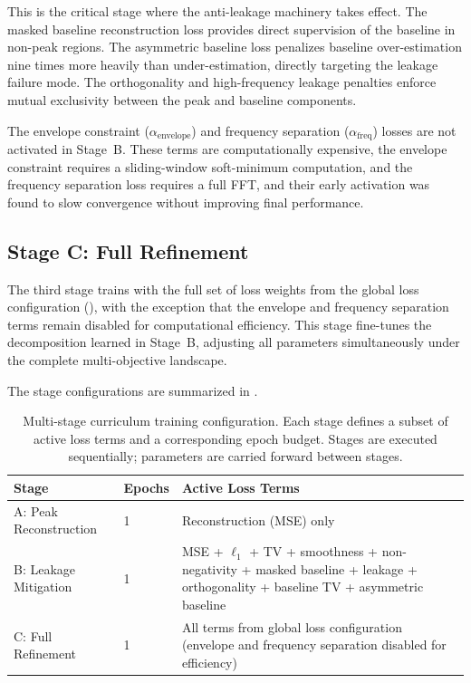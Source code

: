 This is the critical stage where the anti-leakage machinery takes effect. The masked baseline reconstruction loss provides direct supervision of the baseline in non-peak regions. The asymmetric baseline loss penalizes baseline over-estimation nine times more heavily than under-estimation, directly targeting the leakage failure mode. The orthogonality and high-frequency leakage penalties enforce mutual exclusivity between the peak and baseline components.

The envelope constraint ($\alpha_{\text{envelope}}$) and frequency separation ($\alpha_{\text{freq}}$) losses are not activated in Stage~B. These terms are computationally expensive, the envelope constraint requires a sliding-window soft-minimum computation, and the frequency separation loss requires a full FFT, and their early activation was found to slow convergence without improving final performance.


\subsection{Stage C: Full Refinement}
\label{sec:method_stage_c}

The third stage trains with the full set of loss weights from the global loss configuration (), with the exception that the envelope and frequency separation terms remain disabled for computational efficiency. This stage fine-tunes the decomposition learned in Stage~B, adjusting all parameters simultaneously under the complete multi-objective landscape.

The stage configurations are summarized in .

\begin{table}[t]
    \centering
    \caption{Multi-stage curriculum training configuration. Each stage defines a subset of active loss terms and a corresponding epoch budget. Stages are executed sequentially; parameters are carried forward between stages.}
    \label{tab:curriculum_stages}
    \begin{tabular}{@{}llp{8cm}@{}}
        \toprule
        \textbf{Stage} & \textbf{Epochs} & \textbf{Active Loss Terms} \\
        \midrule
        A: Peak Reconstruction & 1 & Reconstruction (MSE) only \\
        B: Leakage Mitigation & 1 & MSE + $\ell_1$ + TV + smoothness + non-negativity + masked baseline + leakage + orthogonality + baseline TV + asymmetric baseline \\
        C: Full Refinement & 1 & All terms from global loss configuration (envelope and frequency separation disabled for efficiency) \\
        \bottomrule
    \end{tabular}
\end{table}


